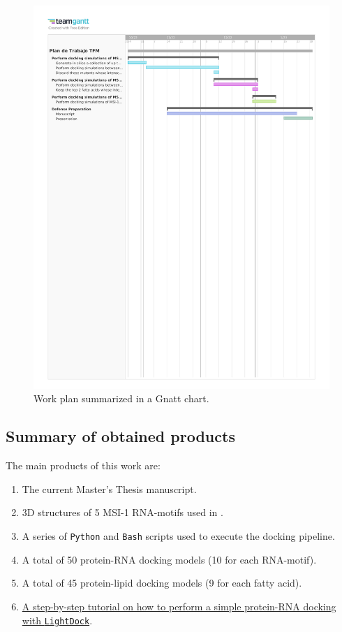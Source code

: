 \begin{figure}[htbp!]
    \centering
    \includegraphics[width=\linewidth, trim={1cm 18.5cm 1cm 2cm},clip]{assets/Plan_de_Trabajo_TFM.pdf}
    \caption{Work plan summarized in a Gnatt chart.}
    \label{fig:gnatt}    
\end{figure}

\subsection{Summary of obtained products}

The main products of this work are:

\begin{enumerate}
    \item The current Master's Thesis manuscript.
    \item 3D structures of 5 MSI-1 RNA-motifs used in \cite{dolcemascolo_2022}.
    \item A series of \texttt{Python} and \texttt{Bash} scripts used to execute the docking pipeline.
    \item A total of 50 protein-RNA docking models (10 for each RNA-motif).
    \item A total of 45 protein-lipid docking models (9 for each fatty acid).
    \item\href{https://lightdock.org/tutorials/0.9.3/rna_docking}{A step-by-step tutorial on how to perform a simple protein-RNA docking with \texttt{LightDock}}.
\end{enumerate}


